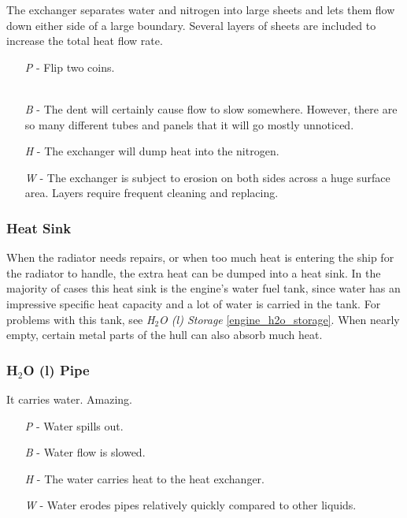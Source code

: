 \documentclass[a4paper]{article}
\begin{document}
The exchanger separates water and nitrogen into large sheets and lets them flow down either side of a large boundary. Several layers of sheets are included to increase the total heat flow rate.
\begin{enumerate}
\item [\textit{P}] - Flip two coins. \newline \hspace*{3pt}  \\ \hspace*{3pt}  \\
\item [\textit{B}] - The dent will certainly cause flow to slow somewhere. However, there are so many different tubes and panels that it will go mostly unnoticed.
\item [\textit{H}] - The exchanger will dump heat into the nitrogen.
\item [\textit{W}] - The exchanger is subject to erosion on both sides across a huge surface area. Layers require frequent cleaning and replacing.
\end{enumerate}

\vspace{-0.5cm} \hspace{-18pt} \subsubsection{Heat Sink} \label{thermal_sink} \vspace{-0.2cm}
When the radiator needs repairs, or when too much heat is entering the ship for the radiator to handle, the extra heat can be dumped into a heat sink. In the majority of cases this heat sink is the engine's water fuel tank, since water has an impressive specific heat capacity and a lot of water is carried in the tank. For problems with this tank, see \textit{H$_2$O (l) Storage} \ref{engine_h2o_storage}. When nearly empty, certain metal parts of the hull can also absorb much heat. 

\vspace{-0.5cm} \hspace{-18pt} \subsubsection{H$_2$O (l) Pipe} \label{thermal_h2o_pipe} \vspace{-0.2cm}
It carries water. Amazing.
\begin{enumerate}
\item [\textit{P}] - Water spills out.
\item [\textit{B}] - Water flow is slowed.
\item [\textit{H}] - The water carries heat to the heat exchanger.
\item [\textit{W}] - Water erodes pipes relatively quickly compared to other liquids.
\end{enumerate}
\end{document}
